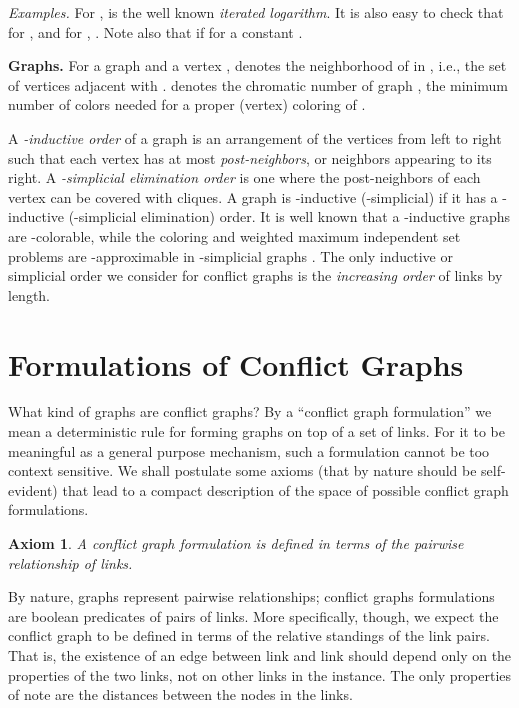 \documentclass[11pt]{article}
\newcommand{\mypara}[1]{\smallskip\noindent\textbf{#1.}}  \newcommand{\tightpara}[1]{\noindent\textbf{#1.}}
\newtheorem{axiom}{Axiom}
\begin{document}
\textit{Examples. } For ,  is the well known \emph{iterated logarithm}. It is also easy to check that for ,  and for , . Note also that  if  for a constant .

\mypara{Graphs} For a graph  and a vertex , \label{G:nv} denotes the neighborhood of  in , i.e.,
the set of vertices adjacent with .  \label{G:chi} denotes the chromatic number of graph , the minimum
number of colors needed for a proper (vertex) coloring of .

A \emph{-inductive order} of a graph is an arrangement of the vertices from left to right such that each vertex has
at most  \emph{post-neighbors}, or neighbors appearing to its right.  A \emph{-simplicial elimination order} is
one where the post-neighbors of each vertex can be covered with  cliques.  A graph is -inductive (-simplicial)
if it has a -inductive (-simplicial elimination) order.  It is well known that a -inductive graphs are
-colorable, while the coloring and weighted maximum independent set problems are -approximable in -simplicial
graphs \cite{ackoglu, kammertholey, yeborodin}.
The only inductive or simplicial order we consider for conflict graphs is the \emph{increasing order} of links by length.



\section{Formulations of Conflict Graphs}
\label{S:formul}

What kind of graphs are conflict graphs? By a ``conflict graph formulation'' we mean a
deterministic rule for forming graphs on top of a set of links.  For it to be meaningful as a general purpose
mechanism, such a formulation cannot be too context sensitive.  We shall postulate some axioms
(that by nature should be self-evident) that lead to a compact description of the space of
possible conflict graph formulations.

\begin{axiom}
A conflict graph formulation is defined in terms of the \emph{pairwise relationship} of links.
\label{axiom:pairwise}
\end{axiom}

By nature, graphs represent pairwise relationships; conflict graphs formulations are boolean predicates of
pairs of links.  More specifically, though, we expect the conflict graph to be defined in terms of the
relative standings of the link pairs. That is, the existence of an edge between link  and link  should
depend only on the properties of the two links, not on other links in the instance.  The only properties
of note are the  distances between the nodes in the links.
\end{document}
